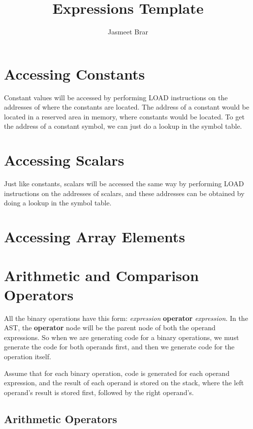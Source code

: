 \documentclass{article}
\begin{document}
	\title{Expressions Template}
	\author{Jasmeet Brar}
    \maketitle


\section{Accessing Constants}

Constant values will be accessed by performing LOAD instructions on the addresses of where the constants are located. The address of a constant would be located in a reserved area in memory, where constants would be located. To get the address of a constant symbol, we can just do a lookup in the symbol table.

\section{Accessing Scalars}

Just like constants, scalars will be accessed the same way by performing LOAD instructions on the addresses of scalars, and these addresses can be obtained by doing a lookup in the symbol table.

\section{Accessing Array Elements}

\section{Arithmetic and Comparison Operators}

All the binary operations have this form: \textit{expression} \textbf{operator} \textit{expression}. In the AST, the \textbf{operator} node will be the parent node of both the operand expressions. So when we are generating code for a binary operations, we must generate the code for both operands first, and then we generate code for the operation itself.

Assume that for each binary operation, code is generated for each operand expression, and the result of each operand is stored on the stack, where the left operand's result is stored first, followed by the right operand's.

\subsection{Arithmetic Operators}
\end{document}
